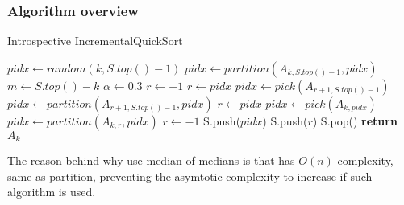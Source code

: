 \subsubsection{Algorithm overview}
\begin{algorithm}
  \begin{algorithmic}[1]
    \caption{Introspective IncrementalQuickSort}\label{ALG:IIQS}
    \State $pidx \gets random(k,S.top()-1)$
    \State $pidx \gets partition(A_{k,S.top()-1}, pidx)$
    \State $m \gets S.top() - k$
    \State $\alpha \gets 0.3$
    \State $r \gets -1$
    \State $r \gets pidx$
    \State $pidx \gets pick(A_{r+1,S.top()-1})$
    \State $pidx \gets partition(A_{r+1,S.top()-1},pidx)$
    \State $r \gets pidx$
    \State $pidx \gets pick(A_{k,pidx})$
    \State $pidx \gets partition(A_{k,r}, pidx)$
    \State $r \gets -1$
    \EndIf
    \State S.push($pidx$)
    \State S.push($r$)
    \EndIf
    \EndWhile
    \State S.pop()
    \State \textbf{return} $A_{k}$\label{IIQS_main_cycle}
    \EndProcedure
  \end{algorithmic}
\end{algorithm}

The reason behind why use median of medians is that has $O(n)$ complexity, same as partition, preventing the asymtotic complexity to increase if such algorithm is used.
